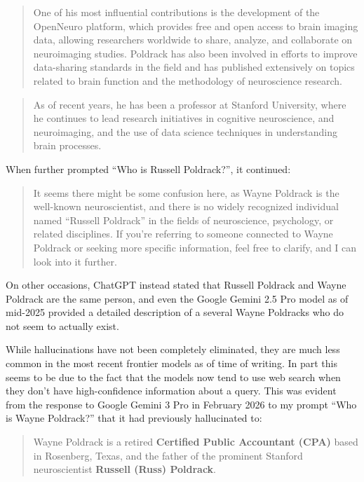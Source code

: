 \begin{quote}
One of his most influential contributions is the development of the OpenNeuro platform, which provides free and open access to brain imaging data, allowing researchers worldwide to share, analyze, and collaborate on neuroimaging studies.
Poldrack has also been involved in efforts to improve data-sharing standards in the field and has published extensively on topics related to brain function and the methodology of neuroscience research.
\end{quote}

\begin{quote}
As of recent years, he has been a professor at Stanford University, where he continues to lead research initiatives in cognitive neuroscience, and neuroimaging, and the use of data science techniques in understanding brain processes.
\end{quote}

When further prompted ``Who is Russell Poldrack?'', it continued:

\begin{quote}
It seems there might be some confusion here, as Wayne Poldrack is the well-known neuroscientist, and there is no widely recognized individual named ``Russell Poldrack'' in the fields of neuroscience, psychology, or related disciplines.
If you're referring to someone connected to Wayne Poldrack or seeking more specific information, feel free to clarify, and I can look into it further.
\end{quote}

On other occasions, ChatGPT instead stated that Russell Poldrack and Wayne Poldrack are the same person, and even the  Google Gemini 2.5 Pro model as of mid-2025 provided a detailed description of a several Wayne Poldracks who do not seem to actually exist.

While hallucinations have not been completely eliminated, they are much less common in the most recent frontier models as of time of writing.  In part this seems to be due to the fact that the models now tend to use web search when they don't have high-confidence information about a query.  This was evident from the response to Google Gemini 3 Pro in February 2026 to my prompt ``Who is Wayne Poldrack?'' that it had previously hallucinated to:

\begin{quote}
Wayne Poldrack is a retired \textbf{Certified Public Accountant (CPA)} based in Rosenberg, Texas, and the father of the prominent Stanford neuroscientist \textbf{Russell (Russ) Poldrack}.
\end{quote}

